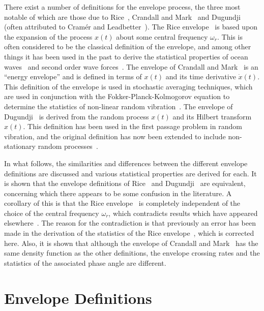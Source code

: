 \documentclass[12pt]{article}
\theoremstyle{plain}
\theoremstyle{definition}
\theoremstyle{remark}
\begin{document}
There exist a number of definitions for the envelope process, the three most notable of which are those due to Rice~\cite{rice1954}, Crandall and Mark~\cite{crandall1963} and Dugundji~\cite{dugundji1958} (often attributed to Cramér and Leadbetter~\cite{cramer1967}). The Rice envelope~\cite{rice1954} is based upon the expansion of the process $x(t)$ about some central frequency $\omega_r$. This is often considered to be the classical definition of the envelope, and among other things it has been used in the past to derive the statistical properties of ocean waves~\cite{longuet-higgins1974} and second order wave forces~\cite{langley1984}. The envelope of Crandall and Mark~\cite{crandall1963} is an ``energy envelope'' and is defined in terms of $x(t)$ and its time derivative $\dot{x}(t)$. This definition of the envelope is used in stochastic averaging techniques, which are used in conjunction with the Fokker-Planck-Kolmogorov equation to determine the statistics of non-linear random vibration~\cite{roberts1976}. The envelope of Dugundji~\cite{dugundji1958} is derived from the random process $x(t)$ and its Hilbert transform $\hat{x}(t)$. This definition has been used in the first passage problem in random vibration, and the original definition has now been extended to include non-stationary random processes~\cite{yang1972,krenk1983}.

In what follows, the similarities and differences between the different envelope definitions are discussed and various statistical properties are derived for each. It is shown that the envelope definitions of Rice~\cite{rice1954} and Dugundji~\cite{dugundji1958} are equivalent, concerning which there appears to be some confusion in the literature. A corollary of this is that the Rice envelope~\cite{rice1954} is completely independent of the choice of the central frequency $\omega_r$, which contradicts results which have appeared elsewhere~\cite{lin1967,lin1976}. The reason for the contradiction is that previously an error has been made in the derivation of the statistics of the Rice envelope~\cite{rice1954}, which is corrected here. Also, it is shown that although the envelope of Crandall and Mark~\cite{crandall1963} has the same density function as the other definitions, the envelope crossing rates and the statistics of the associated phase angle are different.

\section{Envelope Definitions}
\end{document}
